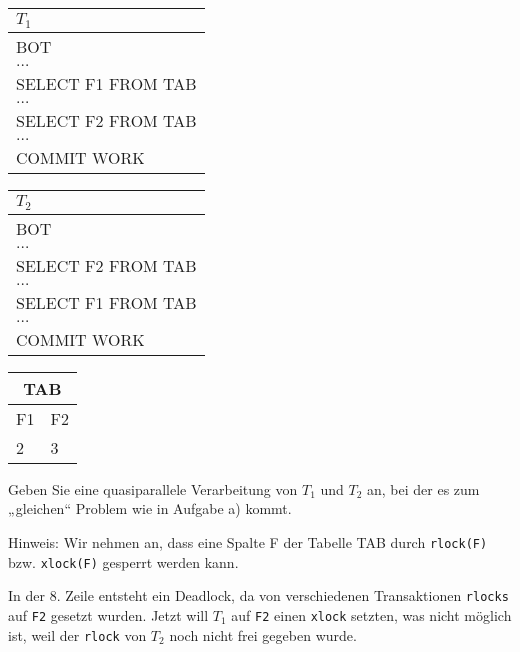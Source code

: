 \documentclass{bschlangaul-aufgabe}
\begin{document}
\begin{enumerate}
\begin{center}
\begin{tabular}{|l|}
\hline
$T_1$ \\\hline
BOT \\\hline
$\dots$ \\\hline
SELECT F1 FROM TAB \\\hline
$\dots$ \\\hline
SELECT F2 FROM TAB \\\hline
$\dots$ \\\hline
COMMIT WORK \\\hline
\end{tabular}
%
\begin{tabular}{|l|}
\hline
$T_2$ \\\hline
BOT \\\hline
$\dots$ \\\hline
SELECT F2 FROM TAB \\\hline
$\dots$ \\\hline
SELECT F1 FROM TAB \\\hline
$\dots$ \\\hline
COMMIT WORK \\\hline
\end{tabular}
%
\begin{tabular}{|l|l|}
\hline
\multicolumn{2}{|c|}{TAB} \\\hline
F1 & F2 \\\hline
2 & 3 \\\hline
\end{tabular}
\end{center}

Geben Sie eine quasiparallele Verarbeitung von $T_1$ und $T_2$ an, bei
der es zum „gleichen“ Problem wie in Aufgabe a) kommt.

Hinweis: Wir nehmen an, dass eine Spalte F der Tabelle TAB durch
\texttt{rlock(F)} bzw. \texttt{xlock(F)} gesperrt werden kann.

\begin{bAntwort}
In der 8. Zeile entsteht ein Deadlock, da von verschiedenen
Transaktionen \texttt{rlocks} auf \texttt{F2} gesetzt wurden. Jetzt will
\texttt{$T_1$} auf \texttt{F2} einen \texttt{xlock} setzten, was nicht
möglich ist, weil der \texttt{rlock} von \texttt{$T_2$} noch nicht frei
gegeben wurde.


\end{bAntwort}
\end{enumerate}
\end{document}
